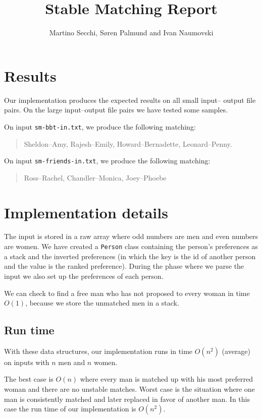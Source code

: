 \documentclass{tufte-handout}
\title{Stable Matching Report}
\author{Martino Secchi, Søren Palmund and Ivan Naumovski}
\begin{document}
  \maketitle

  \section{Results}

  Our implementation produces the expected results on all small input--
  output file pairs. On the large input--output file pairs we have tested
  some samples.

  \noindent
  On input {\tt sm-bbt-in.txt}, we produce the following matching:
  \begin{quotation}
    Sheldon--Amy, Rajesh--Emily, Howard--Bernadette, Leonard--Penny.
  \end{quotation}
  
  \noindent
  On input {\tt sm-friends-in.txt}, we produce the following matching:
  \begin{quotation}
  	Ross--Rachel, Chandler--Monica, Joey--Phoebe
  \end{quotation}

  \section{Implementation details}

  The input is stored in a raw array where odd numbers are men and even numbers 
  are women. We have created a {\tt Person} class containing the person's preferences 
  as a stack and the inverted preferences (in which the key is the id of another person 
  and the value is the ranked preference).
    During the phase where we parse the input we also set up the preferences of each person.

  We can check to find a free man who has not proposed to every woman in time $O(1)$, 
  because we store the unmatched men in a stack.
  
  \subsection{Run time}

  With these data structures, our implementation runs in time $O(n^2)$ (average) on 
  inputs with $n$ men and $n$ women.

  The best case is $O(n)$ where every man is matched up with his most preferred woman
  and there are no unstable matches. Worst case is the situation where one man is consistently
  matched and later replaced in favor of another man. In this case the run time of our 
  implementation is $O(n^2)$.
\end{document}
